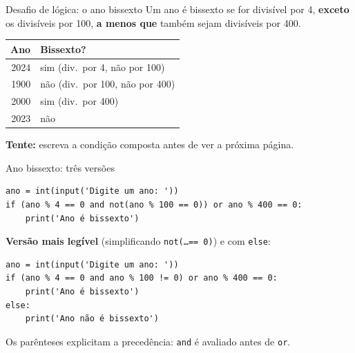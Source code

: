 \documentclass[aspectratio=169,10pt,t]{beamer}
\begin{document}
\begin{frame}{Desafio de lógica: o ano bissexto}
  Um ano é bissexto se for divisível por 4, \textbf{exceto} os divisíveis por 100, \textbf{a menos que} também sejam divisíveis por 400.
  \vspace{1ex}
  \begin{center}\small
    \begin{tabular}{rl}
      \toprule
      Ano & Bissexto?\\
      \midrule
      2024 & sim (div.\ por 4, não por 100)\\
      1900 & \alert{não} (div.\ por 100, não por 400)\\
      2000 & sim (div.\ por 400)\\
      2023 & não\\
      \bottomrule
    \end{tabular}
  \end{center}
  \vspace{1ex}
  \textbf{Tente:} escreva a condição composta antes de ver a próxima página.
\end{frame}

\begin{frame}[fragile]{Ano bissexto: três versões}
\begin{lstlisting}
ano = int(input('Digite um ano: '))
if (ano % 4 == 0 and not(ano % 100 == 0)) or ano % 400 == 0:
    print('Ano é bissexto')
\end{lstlisting}
  \textbf{Versão mais legível} (simplificando \texttt{not(\ldots == 0)}) e com \texttt{else}:
\begin{lstlisting}
ano = int(input('Digite um ano: '))
if (ano % 4 == 0 and ano % 100 != 0) or ano % 400 == 0:
    print('Ano é bissexto')
else:
    print('Ano não é bissexto')
\end{lstlisting}
  \small Os parênteses explicitam a precedência: \texttt{and} é avaliado antes de \texttt{or}.\\
\end{frame}
\end{document}
